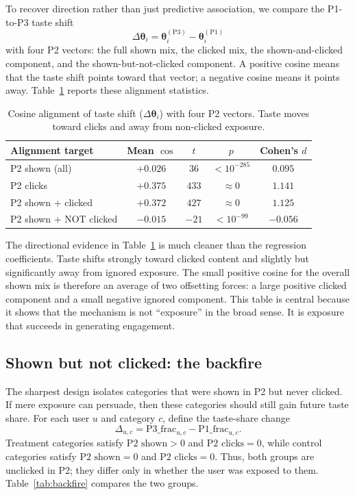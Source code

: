 \documentclass[11pt]{article}
\begin{document}
To recover direction rather than just predictive association, we compare the P1-to-P3 taste shift
\[
\Delta\boldsymbol{\theta}_i = \boldsymbol{\theta}_i^{(\mathrm{P3})} - \boldsymbol{\theta}_i^{(\mathrm{P1})}
\]
with four P2 vectors: the full shown mix, the clicked mix, the shown-and-clicked component, and the shown-but-not-clicked component. A positive cosine means that the taste shift points toward that vector; a negative cosine means it points away. Table~\ref{tab:cosine_alignment} reports these alignment statistics.

\begin{table}[ht]
\centering
\caption{Cosine alignment of taste shift ($\Delta\boldsymbol{\theta}_i$) with four P2 vectors. Taste moves toward clicks and away from non-clicked exposure.}
\label{tab:cosine_alignment}
\begin{tabular}{lcccc}
\toprule
Alignment target & Mean $\cos$ & $t$ & $p$ & Cohen's $d$ \\
\midrule
P2 shown (all) & $+0.026$ & $36$ & $< 10^{-285}$ & $0.095$ \\
P2 clicks & $+0.375$ & $433$ & $\approx 0$ & $1.141$ \\
P2 shown + clicked & $+0.372$ & $427$ & $\approx 0$ & $1.125$ \\
P2 shown + NOT clicked & $\mathbf{-0.015}$ & $-21$ & $< 10^{-99}$ & $-0.056$ \\
\bottomrule
\end{tabular}
\end{table}
\FloatBarrier

The directional evidence in Table~\ref{tab:cosine_alignment} is much cleaner than the regression coefficients. Taste shifts strongly toward clicked content and slightly but significantly away from ignored exposure. The small positive cosine for the overall shown mix is therefore an average of two offsetting forces: a large positive clicked component and a small negative ignored component. This table is central because it shows that the mechanism is not ``exposure'' in the broad sense. It is exposure that succeeds in generating engagement.
\subsection{Shown but not clicked: the backfire}
\label{sec:shown_not_clicked}

The sharpest design isolates categories that were shown in P2 but never clicked. If mere exposure can persuade, then these categories should still gain future taste share. For each user $u$ and category $c$, define the taste-share change
\[
\Delta_{u,c} = \text{P3\_frac}_{u,c} - \text{P1\_frac}_{u,c}.
\]
Treatment categories satisfy $\text{P2 shown}>0$ and $\text{P2 clicks}=0$, while control categories satisfy $\text{P2 shown}=0$ and $\text{P2 clicks}=0$. Thus, both groups are unclicked in P2; they differ only in whether the user was exposed to them. Table~\ref{tab:backfire} compares the two groups.
\end{document}
